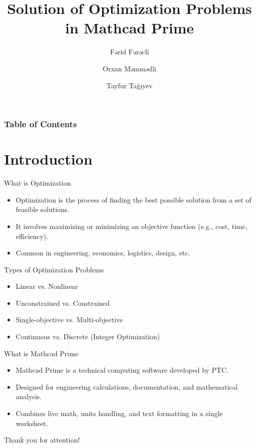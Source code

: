 \documentclass{beamer}
\title{\large Solution of Optimization Problems in Mathcad Prime\textsuperscript{\tiny\textregistered}}
\author{Fərid Fərəcli \and Orxan Məmmədli \and Tayfur Tağıyev}
\institute{Azerbaijan State Oil and Industry University}
\begin{document}
\maketitle

\begin{frame}
\frametitle{Table of Contents}
\tableofcontents
\end{frame}

\section{Introduction}

\begin{frame}{What is Optimization}
\begin{itemize}
\item Optimization is the process of finding the best possible solution from a set of feasible solutions.
\vspace{10pt}
\item It involves maximizing or minimizing an objective function (e.g., cost, time, efficiency).
\vspace{10pt}
\item Common in engineering, economics, logistics, design, etc.
\end{itemize}
\end{frame}

\begin{frame}{Types of Optimization Problems}
\begin{itemize}
\item Linear vs. Nonlinear
\item Unconstrained vs. Constrained
\item Single-objective vs. Multi-objective
\item Continuous vs. Discrete (Integer Optimization)
\end{itemize}
\end{frame}

\begin{frame}{What is Mathcad Prime\textsuperscript{\tiny\textregistered}}
\begin{itemize}
\item Mathcad Prime\textsuperscript{\tiny\textregistered} is a technical computing software developed by PTC.
\vspace{10pt}
\item Designed for engineering calculations, documentation, and mathematical analysis.
\vspace{10pt}
\item Combines live math, units handling, and text formatting in a single worksheet.
\end{itemize}
\end{frame}

\begin{frame}{}
\begin{center}
Thank you for attention!
\end{center}
\end{frame}
\end{document}
